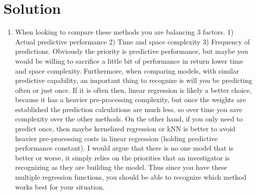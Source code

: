 \documentclass[submit]{harvardml}
\newenvironment{solution}
  {\color{blue}\section*{Solution}}
{}
\begin{document}
\begin{solution}
\begin{enumerate}
            \item When looking to compare these methods you are balancing 3 factors. 1) Actual predictive performance 2) Time and space complexity 3) Frequency of predictions. Obviously the priority is predictive performance, but maybe you would be willing to sacrifice a little bit of performance in return lower time and space complexity. Furthermore, when comparing models, with similar predictive capability, an important thing to recognize is will you be predicting often or just once. If it is often then, linear regression is likely a better choice, because it has a heavier pre-processing complexity, but once the weights are established the prediction calculations are much less, so over time you save complexity over the other methods. On the other hand, if you only need to predict once, then maybe kernelized regression or kNN is better to avoid heavier pre-processing costs in linear regression (holding predictive performance constant). I would argue that there is no one model that is better or worse, it simply relies on the priorities that an investigator is recognizing as they are building the model. Thus since you have these multiple regression functions, you should be able to recognize which method works best for your situation. 
            
        \end{enumerate}
\end{solution}
\end{document}
